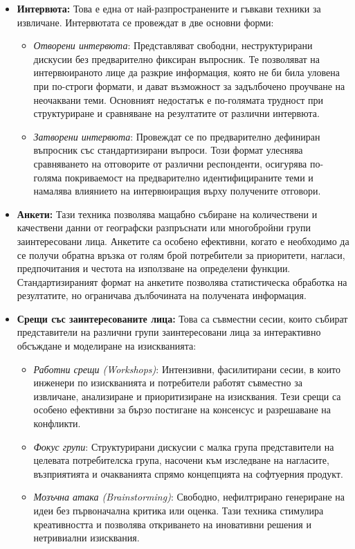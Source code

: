 \documentclass{scrartcl}
\begin{document}
\begin{FlushLeft}
\begin{itemize}
    \item \textbf{Интервюта:} Това е една от най-разпространените и гъвкави техники за извличане. Интервютата се провеждат в две основни форми:
    \begin{itemize}
        \item \textit{Отворени интервюта}: Представляват свободни, неструктурирани дискусии без предварително фиксиран въпросник. Те позволяват на интервюираното лице да разкрие информация, която не би била уловена при по-строги формати, и дават възможност за задълбочено проучване на неочаквани теми. Основният недостатък е по-голямата трудност при структуриране и сравняване на резултатите от различни интервюта.
        \item \textit{Затворени интервюта}: Провеждат се по предварително дефиниран въпросник със стандартизирани въпроси. Този формат улеснява сравняването на отговорите от различни респонденти, осигурява по-голяма покриваемост на предварително идентифицираните теми и намалява влиянието на интервюиращия върху получените отговори.
    \end{itemize}
    
    \item \textbf{Анкети:} Тази техника позволява мащабно събиране на количествени и качествени данни от географски разпръснати или многобройни групи заинтересовани лица. Анкетите са особено ефективни, когато е необходимо да се получи обратна връзка от голям брой потребители за приоритети, нагласи, предпочитания и честота на използване на определени функции. Стандартизираният формат на анкетите позволява статистическа обработка на резултатите, но ограничава дълбочината на получената информация.
    
    \item \textbf{Срещи със заинтересованите лица:} Това са съвместни сесии, които събират представители на различни групи заинтересовани лица за интерактивно обсъждане и моделиране на изискванията:
    \begin{itemize}
        \item \textit{Работни срещи (Workshops)}: Интензивни, фасилитирани сесии, в които инженери по изискванията и потребители работят съвместно за извличане, анализиране и приоритизиране на изисквания. Тези срещи са особено ефективни за бързо постигане на консенсус и разрешаване на конфликти.
        \item \textit{Фокус групи}: Структурирани дискусии с малка група представители на целевата потребителска група, насочени към изследване на нагласите, възприятията и очакванията спрямо концепцията на софтуерния продукт.
        \item \textit{Мозъчна атака (Brainstorming)}: Свободно, нефилтрирано генериране на идеи без първоначална критика или оценка. Тази техника стимулира креативността и позволява откриването на иновативни решения и нетривиални изисквания.
    \end{itemize}
    

\end{itemize}
\end{FlushLeft}
\end{document}
